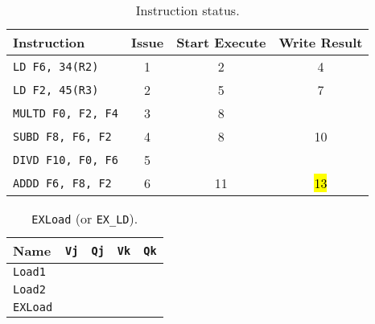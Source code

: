 \begin{enumerate}
    \begin{table}[!htp]
        \centering
        \begin{tabular}{@{} l | c c c @{}}
            \toprule
            Instruction                 & Issue & Start Execute & Write Result  \\
            \midrule
            \texttt{LD    F6, 34(R2)}   & 1     & 2             & 4             \\ [.3em]
            \texttt{LD    F2, 45(R3)}   & 2     & 5             & 7             \\ [.3em]
            \texttt{MULTD F0, F2, F4}   & 3     & 8             &               \\ [.3em]
            \texttt{SUBD  F8, F6, F2}   & 4     & 8             & 10            \\ [.3em]
            \texttt{DIVD  F10, F0, F6}  & 5     &               &               \\ [.3em]
            \texttt{ADDD  F6, F8, F2}   & 6     & 11            & \hl{13}       \\
            \bottomrule
        \end{tabular}
        \caption*{Instruction status.}
    \end{table}

    \begin{table}[!htp]
        \centering
        \begin{tabular}{@{} l | c c c c @{}}
            \toprule
            Name            & \texttt{Vj}   & \texttt{Qj}   & \texttt{Vk}           & \texttt{Qk}   \\
            \midrule
            \texttt{Load1}  &               &               &                       &               \\ [.3em]
            \texttt{Load2}  &               &               &                       &               \\
            \cmidrule{1-5}
            \texttt{EXLoad} &               &               &                       &               \\
            \bottomrule
        \end{tabular}
        \caption*{\texttt{EXLoad} (or \texttt{EX\_LD}).}
    \end{table}


\end{enumerate}
